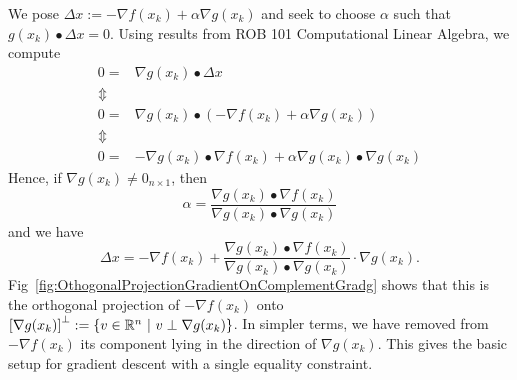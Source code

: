 We pose $\Delta x := -\nabla f(x_k) + \alpha \nabla g(x_k)$ and seek to choose $\alpha$ such that
$g(x_k) \bullet \Delta x = 0$. Using results from ROB 101 Computational Linear Algebra, we compute
\begin{equation}
\begin{aligned}    
    0 =& \nabla g(x_k) \bullet \Delta x \\
    \Updownarrow & \\
    0 =& \nabla g(x_k) \bullet \left( -\nabla f(x_k) + \alpha \nabla g(x_k)\right) \\
     \Updownarrow & \\
   0=& -\nabla g(x_k) \bullet \nabla f(x_k) + \alpha \nabla g(x_k) \bullet \nabla g(x_k) 
\end{aligned}
\end{equation}
Hence, if $ \nabla g(x_k) \neq 0_{n \times 1}$, then 
\begin{equation}
    \alpha = \frac{\nabla g(x_k) \bullet \nabla f(x_k)}{\nabla g(x_k) \bullet \nabla g(x_k)}
\end{equation}
and we have
\begin{equation}
    \Delta x =  - \nabla f(x_k) + \frac{\nabla g(x_k) \bullet \nabla f(x_k)}{\nabla g(x_k) \bullet \nabla g(x_k)} \cdot \nabla g(x_k).
\end{equation}
Fig~\ref{fig:OthogonalProjectionGradientOnComplementGradg} shows that this is the orthogonal projection of $-\nabla f(x_k)$ onto $\left[ \nabla g(x_k)\right]^\perp:= \{ v \in \mathbb R^n~|~ v \perp \nabla g(x_k)  \}$. In simpler terms, we have removed from $-\nabla f(x_k)$ its component lying in the direction of $\nabla g(x_k)$. This gives the basic setup for gradient descent with a single equality constraint. 
\bigskip

